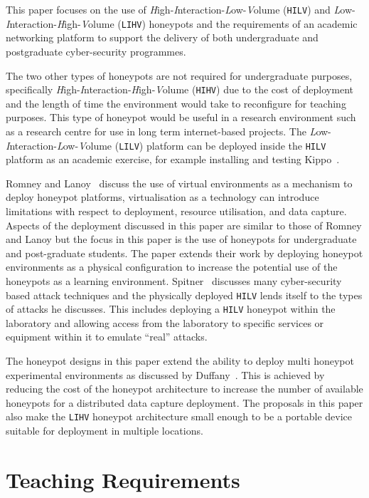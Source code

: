This paper focuses on the use of \emph{H}igh-\emph{I}nteraction-\emph{L}ow-\emph{V}olume (\texttt{HILV}) and \emph{L}ow-\emph{I}nteraction-\emph{H}igh-\emph{V}olume (\texttt{LIHV}) honeypots and the requirements of an academic networking platform to support the delivery of both undergraduate and postgraduate cyber-security programmes. 

The two other types of honeypots are not required for undergraduate purposes, specifically \emph{H}igh-\emph{I}nteraction-\emph{H}igh-\emph{V}olume (\texttt{HIHV}) due to the cost of deployment and the length of time the environment would take to reconfigure for teaching purposes. This type of honeypot would be useful in a research environment such as a research centre for use in long term internet-based projects. The \emph{L}ow-\emph{I}nteraction-\emph{L}ow-\emph{V}olume (\texttt{LILV}) platform can be deployed inside the \texttt{HILV} platform as an academic exercise, for example installing and testing Kippo~\cite{D:16,SH:15}.

Romney and Lanoy~\cite{LR:06} discuss the use of virtual environments as a mechanism to deploy honeypot platforms, virtualisation as a technology can introduce limitations with respect to deployment, resource utilisation, and data capture. Aspects of the deployment discussed in this paper are similar to those of Romney and Lanoy but the focus in this paper is the use of honeypots for undergraduate and post-graduate students. The paper extends their work by deploying honeypot environments as a physical configuration to increase the potential use of the honeypots as a learning environment. Spitner~\cite{LS:03} discusses many cyber-security based attack techniques and the physically deployed \texttt{HILV} lends itself to the types of attacks he discusses. This includes deploying a \texttt{HILV} honeypot within the laboratory and allowing access from the laboratory to specific services or equipment within it to emulate ``real'' attacks. 

The honeypot designs in this paper extend the ability to deploy multi honeypot experimental environments as discussed by Duffany~\cite{JD:08}. This is achieved by reducing the cost of the honeypot architecture to increase the number of available honeypots for a distributed data capture deployment. The proposals in this paper also make the \texttt{LIHV} honeypot architecture small enough to be a portable device suitable for deployment in multiple locations.

\section{Teaching Requirements}\label{sec:TeachingRequire}

